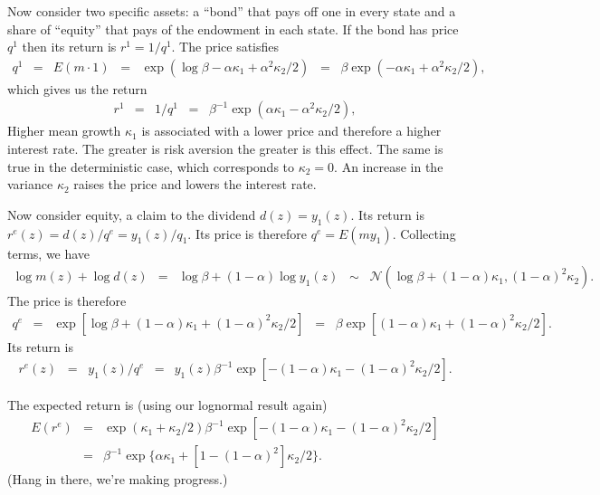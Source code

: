 \documentclass[11pt]{article}
\begin{document}
Now consider two specific assets:  a ``bond'' that pays off one in every state
and a share of ``equity'' that pays of the endowment in each state.
If the bond has price $q^1$ then its return is $r^1 = 1/q^1$.
The price satisfies
\begin{eqnarray*}
     q^1 &=& E(m \cdot 1) \;\;=\;\; \exp(\log \beta - \alpha \kappa_1 + \alpha^2 \kappa_2/2 )
            \;\;=\;\; \beta \exp(- \alpha \kappa_1 + \alpha^2 \kappa_2/2 ),
\end{eqnarray*}
which gives us the return
\begin{eqnarray*}
     r^1 &=& 1/q^1
            \;\;=\;\; \beta^{-1} \exp( \alpha \kappa_1 - \alpha^2 \kappa_2/2 ),
\end{eqnarray*}
Higher mean growth $\kappa_1$ is associated with a lower price
and therefore a higher interest rate.
The greater is risk aversion the greater is this effect.
The same is true in the deterministic case,
which corresponds to $\kappa_2 = 0$.
An increase in the variance $\kappa_2$ raises the price and lowers the interest rate.

Now consider equity, a claim to the dividend $d(z) = y_1(z)$.
Its return is $r^e(z) = d(z)/q^e = y_1(z)/q_1$.
Its price is therefore $q^e = E( m y_1)$.
Collecting terms, we have
\begin{eqnarray*}
    \log m(z) + \log d(z) &=& \log \beta  + (1-\alpha) \log y_1(z)
    \;\;\sim\;\; \mathcal{N}(\log \beta + (1-\alpha) \kappa_1, (1-\alpha)^2 \kappa_2).
\end{eqnarray*}
The price is therefore
\begin{eqnarray*}
    q^e &=& \exp[\log \beta + (1- \alpha) \kappa_1 + (1-\alpha)^2 \kappa_2/2 ]
        \;\;=\;\; \beta \exp[(1- \alpha) \kappa_1 + (1-\alpha)^2 \kappa_2/2 ] .
\end{eqnarray*}
Its return is
\begin{eqnarray*}
    r^e(z) \;\;=\;\; y_1(z)/q^e &=&
        y_1(z) \beta^{-1} \exp[-(1- \alpha) \kappa_1 - (1-\alpha)^2 \kappa_2/2 ] .
\end{eqnarray*}

The expected return is (using our lognormal result again)
\begin{eqnarray*}
    E(r^e)  &=&
    \exp(\kappa_1 + \kappa_2/2)  \beta^{-1}
            \exp[-(1- \alpha) \kappa_1 - (1-\alpha)^2 \kappa_2/2 ]  \\
    &=& \beta^{-1} \exp\{\alpha \kappa_1 + [1 - (1-\alpha)^2] \kappa_2/2 \} .
\end{eqnarray*}
(Hang in there, we're making progress.)
\end{document}
